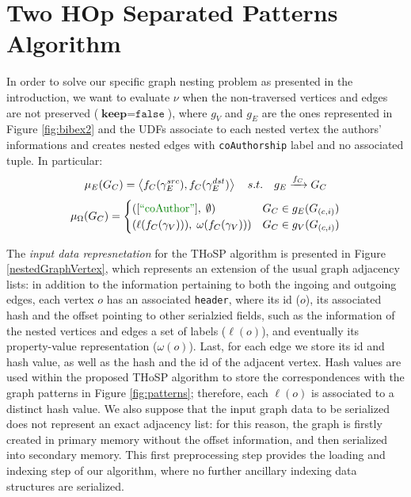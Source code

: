 \section{Two HOp Separated Patterns Algorithm}
\label{sec:THOSPA}
In order to solve our specific graph nesting problem as presented in the introduction, we want to evaluate $\nu$ when the non-traversed vertices and edges are not preserved ($\textbf{keep}=\texttt{false}$), where $g_V$ and $g_E$ are the ones represented in Figure \ref{fig:bibex2} and the UDFs associate to each nested vertex the authors' informations and creates nested edges with \texttt{coAuthorship} label and no associated tuple. In particular:
\[\mu_E(G_C)=\Braket{f_C(\gamma_E^{src}),f_C(\gamma_E^{dst})}\quad s.t.\quad g_E\xrightarrow{f_C}G_C\]
\[\mu_\Omega(G_C)=\begin{cases}
([\mstr{coAuthor}],\;\emptyset) & G_C \in g_E(G_{(c,i)})\\
(\ell(f_C(\gamma_V))),\;\omega(f_C(\gamma_V))) & G_C \in g_V(G_{(c,i)})\\
\end{cases}\]


The \textit{input data  represnetation} for the THoSP algorithm is presented in Figure \ref{nestedGraphVertex}, which represents an  extension of the usual graph adjacency lists: in addition to the information pertaining to both the ingoing and outgoing edges, each vertex $o$ has an associated \texttt{header}, where its id ($o$), its associated hash and the offset pointing to other serialzied fields, such as the information of the  nested vertices and edges a set of labels ($\ell(o)$), and eventually its property-value representation ($\omega(o)$). Last, for each edge we store its id and hash value, as well as the hash and the id of the adjacent vertex. Hash values are used within the proposed THoSP algorithm to store the correspondences with the graph patterns in Figure \ref{fig:patterns}; therefore, each $\ell(o)$ is associated to a distinct hash value. We also suppose that the input graph data to be serialized does not represent an exact adjacency list: for this reason, the graph is firstly created in primary memory without the offset information, and then serialized into secondary memory. This first preprocessing step provides the loading and indexing step of our algorithm, where no further ancillary indexing data structures are serialized.









